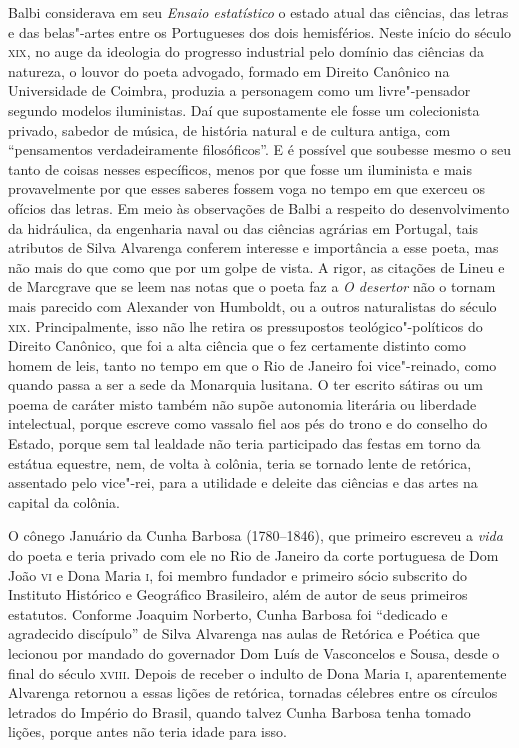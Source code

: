 Balbi considerava em seu \textit{Ensaio estatístico} o estado atual das
ciências, das letras e das belas"-artes entre os Portugueses dos dois
hemisférios. Neste início do século \textsc{xix}, no auge da ideologia do
progresso industrial pelo domínio das ciências da natureza, o louvor do poeta
advogado, formado em Direito Canônico na Universidade de Coimbra, produzia a
personagem como um livre"-pensador segundo modelos iluministas. Daí que
supostamente ele fosse um colecionista privado, sabedor de música, de história
natural e de cultura antiga, com ``pensamentos verdadeiramente filosóficos''. E
é possível que soubesse mesmo o seu tanto de coisas nesses específicos, menos
por que fosse um iluminista e mais provavelmente por que esses saberes fossem voga no tempo em que exerceu os ofícios das letras.  
Em meio às observações de Balbi
a respeito do desenvolvimento da hidráulica, da engenharia naval ou das ciências
agrárias em Portugal, tais atributos de Silva Alvarenga conferem interesse e
importância a esse poeta, mas não mais do que como que por um golpe de vista.  A
rigor, as citações de Lineu e de Marcgrave que se leem nas notas que o poeta faz
a \textit{O desertor} não o tornam mais parecido com Alexander von Humboldt, ou
a outros naturalistas do século \textsc{xix}.  Principalmente, isso não lhe
retira os pressupostos teológico"-políticos do Direito Canônico, que foi a alta
ciência que o fez certamente distinto como homem de leis, tanto no tempo em que
o Rio de Janeiro foi vice"-reinado, como quando passa a ser a sede da Monarquia
lusitana.  O ter escrito sátiras ou um poema de caráter misto também não supõe
autonomia literária ou liberdade intelectual, porque escreve como vassalo fiel
aos pés do trono e do conselho do Estado, porque sem tal lealdade não teria
participado das festas em torno da estátua equestre, nem, de volta à colônia,
teria se tornado lente de retórica, assentado pelo vice"-rei, para a utilidade e
deleite das ciências e das artes na capital da colônia. 

O cônego Januário da Cunha Barbosa (1780--1846), que primeiro escreveu a
\textit{vida} do poeta e teria privado com ele no Rio de Janeiro da corte
portuguesa de Dom João \textsc{vi} e Dona Maria \textsc{i}, foi membro fundador
e primeiro sócio subscrito do Instituto Histórico e Geográfico Brasileiro, além
de autor de seus primeiros estatutos. Conforme Joaquim Norberto, Cunha Barbosa
foi ``dedicado e agradecido discípulo'' de Silva Alvarenga nas aulas de
Retórica e Poética que lecionou por mandado do governador Dom Luís de
Vasconcelos e Sousa, desde o final do século \textsc{xviii}.  Depois de receber
o indulto de Dona Maria \textsc{i}, aparentemente Alvarenga retornou a essas
lições de retórica, tornadas célebres entre os círculos letrados do Império do
Brasil, quando talvez Cunha Barbosa tenha tomado lições, porque antes não teria
idade para isso.

